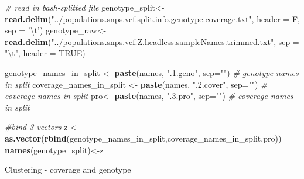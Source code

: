 \documentclass[]{article}
\newenvironment{Shaded}{\begin{snugshade}}{\end{snugshade}}
\newcommand{\KeywordTok}[1]{\textcolor[rgb]{0.13,0.29,0.53}{\textbf{{#1}}}}
\newcommand{\DataTypeTok}[1]{\textcolor[rgb]{0.13,0.29,0.53}{{#1}}}
\newcommand{\CharTok}[1]{\textcolor[rgb]{0.31,0.60,0.02}{{#1}}}
\newcommand{\StringTok}[1]{\textcolor[rgb]{0.31,0.60,0.02}{{#1}}}
\newcommand{\CommentTok}[1]{\textcolor[rgb]{0.56,0.35,0.01}{\textit{{#1}}}}
\newcommand{\OtherTok}[1]{\textcolor[rgb]{0.56,0.35,0.01}{{#1}}}
\newcommand{\NormalTok}[1]{{#1}}
\begin{document}
\begin{Shaded}
\begin{Highlighting}[]
\CommentTok{# read in bash-splitted file}
\NormalTok{genotype_split<-}\KeywordTok{read.delim}\NormalTok{(}\StringTok{"../populations.snps.vcf.split.info.genotype.coverage.txt"}\NormalTok{, }\DataTypeTok{header =} \NormalTok{F, }\DataTypeTok{sep =} \StringTok{'}\CharTok{\textbackslash{}t}\StringTok{'}\NormalTok{)}
\NormalTok{genotype_raw<-}\KeywordTok{read.delim}\NormalTok{(}\StringTok{"../populations.snps.vcf.Z.headless.sampleNames.trimmed.txt"}\NormalTok{, }\DataTypeTok{sep =} \StringTok{"}\CharTok{\textbackslash{}t}\StringTok{"}\NormalTok{, }\DataTypeTok{header =} \OtherTok{TRUE}\NormalTok{) }

\NormalTok{genotype_names_in_split <-}\StringTok{ }\KeywordTok{paste}\NormalTok{(names, }\StringTok{".1.geno"}\NormalTok{, }\DataTypeTok{sep=}\StringTok{""}\NormalTok{) }\CommentTok{# genotype names in split}
\NormalTok{coverage_names_in_split <-}\StringTok{ }\KeywordTok{paste}\NormalTok{(names, }\StringTok{".2.cover"}\NormalTok{, }\DataTypeTok{sep=}\StringTok{""}\NormalTok{) }\CommentTok{# coverage names in split}
\NormalTok{pro<-}\StringTok{ }\KeywordTok{paste}\NormalTok{(names, }\StringTok{".3.pro"}\NormalTok{, }\DataTypeTok{sep=}\StringTok{""}\NormalTok{) }\CommentTok{# coverage names in split}

\CommentTok{#bind 3 vectors}
 \NormalTok{z <-}\StringTok{ }\KeywordTok{as.vector}\NormalTok{(}\KeywordTok{rbind}\NormalTok{(genotype_names_in_split,coverage_names_in_split,pro)) }
\KeywordTok{names}\NormalTok{(genotype_split)<-z}
\end{Highlighting}
\end{Shaded}

Clustering - coverage and genotype
\end{document}
